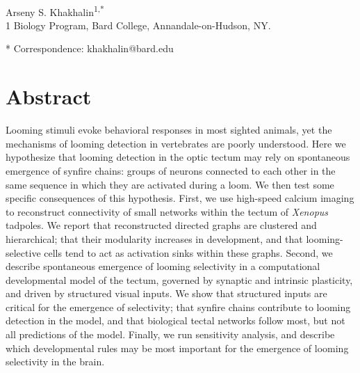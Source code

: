 \documentclass{article}
\begin{document}



\begin{flushleft}
{\Large
\textbf{}
}
\newline
\\
Arseny S. Khakhalin\textsuperscript{1,*}
\\
\bigskip
{1} Biology Program, Bard College, Annandale-on-Hudson, NY. 

* Correspondence: khakhalin@bard.edu






\section*{Abstract}
Looming stimuli evoke behavioral responses in most sighted animals, yet the mechanisms of looming detection in vertebrates are poorly understood. Here we hypothesize that looming detection in the optic tectum may rely on spontaneous emergence of synfire chains: groups of neurons connected to each other in the same sequence in which they are activated during a loom. We then test some specific consequences of this hypothesis. First, we use high-speed calcium imaging to reconstruct connectivity of small networks within the tectum of \textit{Xenopus} tadpoles. We report that reconstructed directed graphs are clustered and hierarchical; that their modularity increases in development, and that looming-selective cells tend to act as activation sinks within these graphs. Second, we describe spontaneous emergence of looming selectivity in a computational developmental model of the tectum, governed by synaptic and intrinsic plasticity, and driven by structured visual inputs. We show that structured inputs are critical for the emergence of selectivity; that synfire chains contribute to looming detection in the model, and that biological tectal networks follow most, but not all predictions of the model. Finally, we run sensitivity analysis, and describe which developmental rules may be most important for the emergence of looming selectivity in the brain.
\bigskip

\end{flushleft} %
\end{document}
